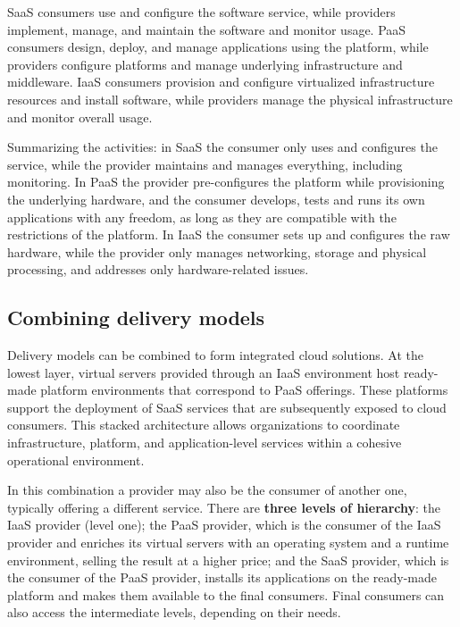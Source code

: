 \begin{center}
\end{center}


SaaS consumers use and configure the software service, while providers implement, manage, and maintain the software and monitor usage. PaaS consumers design, deploy, and manage applications using the platform, while providers configure platforms and manage underlying infrastructure and middleware. IaaS consumers provision and configure virtualized infrastructure resources and install software, while providers manage the physical infrastructure and monitor overall usage.

Summarizing the activities: in SaaS the consumer only uses and configures the service, while the provider maintains and manages everything, including monitoring. In PaaS the provider pre-configures the platform while provisioning the underlying hardware, and the consumer develops, tests and runs its own applications with any freedom, as long as they are compatible with the restrictions of the platform. In IaaS the consumer sets up and configures the raw hardware, while the provider only manages networking, storage and physical processing, and addresses only hardware-related issues.

\begin{center}
\end{center}

\subsection{Combining delivery models}

Delivery models can be combined to form integrated cloud solutions. At the lowest layer, virtual servers provided through an IaaS environment host ready-made platform environments that correspond to PaaS offerings. These platforms support the deployment of SaaS services that are subsequently exposed to cloud consumers. This stacked architecture allows organizations to coordinate infrastructure, platform, and application-level services within a cohesive operational environment.

In this combination a provider may also be the consumer of another one, typically offering a different service. There are \textbf{three levels of hierarchy}: the IaaS provider (level one); the PaaS provider, which is the consumer of the IaaS provider and enriches its virtual servers with an operating system and a runtime environment, selling the result at a higher price; and the SaaS provider, which is the consumer of the PaaS provider, installs its applications on the ready-made platform and makes them available to the final consumers. Final consumers can also access the intermediate levels, depending on their needs.

